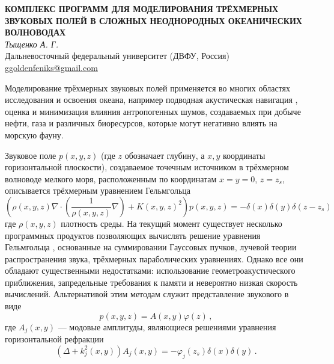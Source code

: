 \documentclass[12pt]{fefu}
\newcommand{\pa}[1]{\left(#1\right)}
\begin{document}
    \thispagestyle{empty}
    \begin{center}
        \textbf{КОМПЛЕКС ПРОГРАММ ДЛЯ МОДЕЛИРОВАНИЯ ТРЁХМЕРНЫХ ЗВУКОВЫХ ПОЛЕЙ В СЛОЖНЫХ НЕОДНОРОДНЫХ ОКЕАНИЧЕСКИХ ВОЛНОВОДАХ}\\
        \vskip 12pt
        \textit{Тыщенко А. Г.}\\
        \vskip 12pt
        Дальневосточный федеральный университет (ДВФУ, Россия)\\
        \vskip 12pt
        \underline{ggoldenfeniks@gmail.com}
    \end{center}
    \par Моделирование трёхмерных звуковых полей применяется во многих областях исследования и освоения океана, например подводная акустическая навигация \cite{navigation19,navigation20}, оценка и минимизация влияния антропогенных шумов, создаваемых при добыче нефти, газа и различных биоресурсов, которые могут негативно влиять на морскую фауну. 
    \par Звуковое поле $p\pa{x,y,z}$ (где $z$ обозначает глубину, а  $x,y$ \textemdash координаты горизонтальной плоскости), создаваемое точечным источником в трёхмерном волноводе мелкого моря, расположенным по координатам $x=y=0$, $z=z_s$, описывается трёхмерным уравнением Гельмгольца \cite{jensen}
    \begin{equation}\label{eq::3DH}
        \pa{\rho\pa{x,y,z}\nabla\cdot\pa{\frac{1}{\rho\pa{x,y,z}}\nabla} + K\pa{x,y,z}^2}p\pa{x,y,z}=-\delta\pa{x}\delta\pa{y}\delta\pa{z-z_s}
    \end{equation}
    где $\rho\pa{x,y,z}$  плотность среды. На текущий момент существует несколько программных продуктов позволяющих вычислять решение уравнения Гельмгольца \cite{bellhop,traceo}, основанные на суммировании Гауссовых пучков, лучевой теории распространения звука, трёхмерных параболических уравнениях. Однако все они обладают существенными недостатками: использование геометроакустического приближения, запредельные требования к памяти и невероятно низкая скорость вычислений. Альтернативой этим методам служит представление звукового в виде
    \begin{equation}
        p\pa{x,y,z}=A\pa{x,y}\varphi\pa{z}\,,
    \end{equation}
    где $A_j\pa{x,y}$ --- модовые амплитуды, являющиеся решениями уравнения горизонтальной рефракции
    \begin{equation}\label{eq::HRE}
        \pa{\Delta+k_j^2\pa{x,y}}A_j\pa{x,y}=-\varphi_j\pa{z_s}\delta\pa{x}\delta\pa{y}\,.
    \end{equation}
\end{document}
